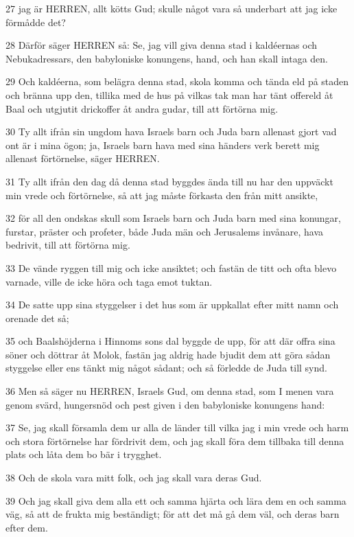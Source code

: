 \par 27 jag är HERREN, allt kötts Gud; skulle något vara så underbart att jag icke förmådde det?
\par 28 Därför säger HERREN så: Se, jag vill giva denna stad i kaldéernas och Nebukadressars, den babyloniske konungens, hand, och han skall intaga den.
\par 29 Och kaldéerna, som belägra denna stad, skola komma och tända eld på staden och bränna upp den, tillika med de hus på vilkas tak man har tänt offereld åt Baal och utgjutit drickoffer åt andra gudar, till att förtörna mig.
\par 30 Ty allt ifrån sin ungdom hava Israels barn och Juda barn allenast gjort vad ont är i mina ögon; ja, Israels barn hava med sina händers verk berett mig allenast förtörnelse, säger HERREN.
\par 31 Ty allt ifrån den dag då denna stad byggdes ända till nu har den uppväckt min vrede och förtörnelse, så att jag måste förkasta den från mitt ansikte,
\par 32 för all den ondskas skull som Israels barn och Juda barn med sina konungar, furstar, präster och profeter, både Juda män och Jerusalems invånare, hava bedrivit, till att förtörna mig.
\par 33 De vände ryggen till mig och icke ansiktet; och fastän de titt och ofta blevo varnade, ville de icke höra och taga emot tuktan.
\par 34 De satte upp sina styggelser i det hus som är uppkallat efter mitt namn och orenade det så;
\par 35 och Baalshöjderna i Hinnoms sons dal byggde de upp, för att där offra sina söner och döttrar åt Molok, fastän jag aldrig hade bjudit dem att göra sådan styggelse eller ens tänkt mig något sådant; och så förledde de Juda till synd.
\par 36 Men så säger nu HERREN, Israels Gud, om denna stad, som I menen vara genom svärd, hungersnöd och pest given i den babyloniske konungens hand:
\par 37 Se, jag skall församla dem ur alla de länder till vilka jag i min vrede och harm och stora förtörnelse har fördrivit dem, och jag skall föra dem tillbaka till denna plats och låta dem bo bär i trygghet.
\par 38 Och de skola vara mitt folk, och jag skall vara deras Gud.
\par 39 Och jag skall giva dem alla ett och samma hjärta och lära dem en och samma väg, så att de frukta mig beständigt; för att det må gå dem väl, och deras barn efter dem.
